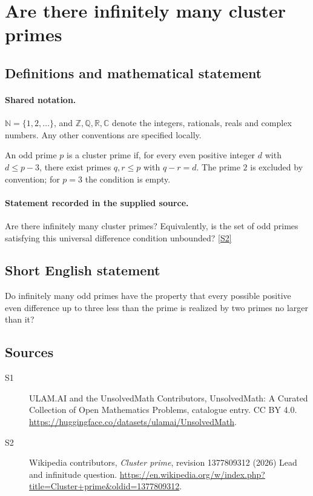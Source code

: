 \documentclass[11pt]{article}
\newcommand{\sref}[2]{\hyperlink{source:#1:#2}{[S#2]}}
\begin{document}
\section{Are there infinitely many cluster primes}\label{statement}

\subsection{Definitions and mathematical statement}

\paragraph{Shared notation.}$\mathbb N=\{1,2,\ldots\}$, and $\mathbb Z,\mathbb Q,\mathbb R,\mathbb C$ denote the integers, rationals, reals and complex numbers. Any other conventions are specified locally.


An odd prime $p$ is a cluster prime if, for every even positive integer $d$ with $d\le p-3$, there exist primes $q,r\le p$ with $q-r=d$. The prime $2$ is excluded by convention; for $p=3$ the condition is empty.
\paragraph{Statement recorded in the supplied source.}
Are there infinitely many cluster primes? Equivalently, is the set of odd primes satisfying this universal difference condition unbounded? \sref{statement}{2}
\subsection{Short English statement}
Do infinitely many odd primes have the property that every possible positive even difference up to three less than the prime is realized by two primes no larger than it?
\subsection{Sources}
\begin{description}
\item[\hypertarget{source:statement:1}{S1}] ULAM.AI and the UnsolvedMath Contributors, UnsolvedMath: A Curated Collection of Open Mathematics Problems, catalogue entry. CC BY 4.0. \url{https://huggingface.co/datasets/ulamai/UnsolvedMath}.
\item[\hypertarget{source:statement:2}{S2}] Wikipedia contributors, \emph{Cluster prime}, revision 1377809312 (2026) Lead and infinitude question. \url{https://en.wikipedia.org/w/index.php?title=Cluster+prime&oldid=1377809312}.
\end{description}
\label{end:statement}
\end{document}
